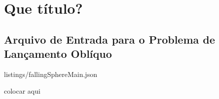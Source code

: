 \chapter{\alert{Que título?}} \label{app:code_listings}

\section{Arquivo de Entrada para o Problema de Lançamento Oblíquo}


	{listings/fallingSphereMain.json}

\alert{colocar aqui}

